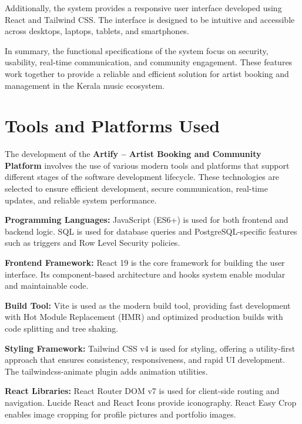 \documentclass[12pt,a4paper]{report}
\begin{document}
Additionally, the system provides a responsive user interface developed using React and Tailwind CSS. The interface is designed to be intuitive and accessible across desktops, laptops, tablets, and smartphones.

In summary, the functional specifications of the system focus on security, usability, real-time communication, and community engagement. These features work together to provide a reliable and efficient solution for artist booking and management in the Kerala music ecosystem.

\section{Tools and Platforms Used}

The development of the \textbf{Artify -- Artist Booking and Community Platform} involves the use of various modern tools and platforms that support different stages of the software development lifecycle. These technologies are selected to ensure efficient development, secure communication, real-time updates, and reliable system performance.

\textbf{Programming Languages:}
JavaScript (ES6+) is used for both frontend and backend logic. SQL is used for database queries and PostgreSQL-specific features such as triggers and Row Level Security policies.

\vspace{0.4cm}

\textbf{Frontend Framework:}
React 19 is the core framework for building the user interface. Its component-based architecture and hooks system enable modular and maintainable code.

\vspace{0.4cm}

\textbf{Build Tool:}
Vite is used as the modern build tool, providing fast development with Hot Module Replacement (HMR) and optimized production builds with code splitting and tree shaking.

\vspace{0.4cm}

\textbf{Styling Framework:}
Tailwind CSS v4 is used for styling, offering a utility-first approach that ensures consistency, responsiveness, and rapid UI development. The tailwindcss-animate plugin adds animation utilities.

\vspace{0.4cm}

\textbf{React Libraries:}
React Router DOM v7 is used for client-side routing and navigation. Lucide React and React Icons provide iconography. React Easy Crop enables image cropping for profile pictures and portfolio images.
\end{document}
